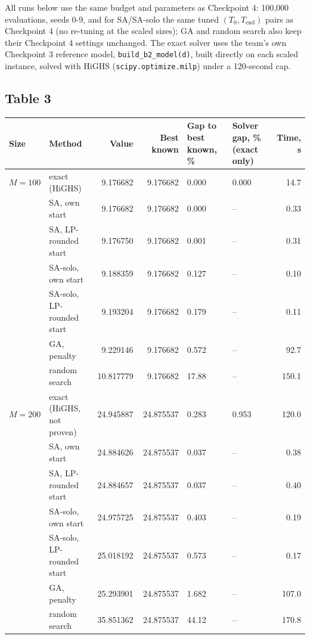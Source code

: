 \documentclass[11pt,a4paper]{article}
\begin{document}
All runs below use the same budget and parameters as Checkpoint 4: 100{,}000 evaluations, seeds 0-9, and for SA/SA-solo the same tuned $(T_0,T_{\mathrm{end}})$ pairs as Checkpoint 4 (no re-tuning at the scaled sizes); GA and random search also keep their Checkpoint 4 settings unchanged. The exact solver uses the team's own Checkpoint 3 reference model, \texttt{build\_b2\_model(d)}, built directly on each scaled instance, solved with HiGHS (\texttt{scipy.optimize.milp}) under a 120-second cap.

\subsection*{Table 3}
{\small
\begin{tabular}{@{}lp{3.8cm}rrp{2.0cm}p{2.2cm}r@{}}
\toprule
Size & Method & Value & Best known & Gap to best known, \% & Solver gap, \% (exact only) & Time, s\\
\midrule
$M{=}100$ & exact (HiGHS)            & 9.176682 & 9.176682 & 0.000 & 0.000 & 14.7\\
          & SA, own start            & 9.176682 & 9.176682 & 0.000 & -- & 0.33\\
          & SA, LP-rounded start     & 9.176750 & 9.176682 & 0.001 & -- & 0.31\\
          & SA-solo, own start       & 9.188359 & 9.176682 & 0.127 & -- & 0.10\\
          & SA-solo, LP-rounded start& 9.193204 & 9.176682 & 0.179 & -- & 0.11\\
          & GA, penalty              & 9.229146 & 9.176682 & 0.572 & -- & 92.7\\
          & random search            & 10.817779& 9.176682 & 17.88 & -- & 150.1\\
\addlinespace
$M{=}200$ & exact (HiGHS, not proven)& 24.945887& 24.875537& 0.283 & 0.953 & 120.0\\
          & SA, own start            & 24.884626& 24.875537& 0.037 & -- & 0.38\\
          & SA, LP-rounded start     & 24.884657& 24.875537& 0.037 & -- & 0.40\\
          & SA-solo, own start       & 24.975725& 24.875537& 0.403 & -- & 0.19\\
          & SA-solo, LP-rounded start& 25.018192& 24.875537& 0.573 & -- & 0.17\\
          & GA, penalty              & 25.293901& 24.875537& 1.682 & -- & 107.0\\
          & random search            & 35.851362& 24.875537& 44.12 & -- & 170.8\\

\end{tabular}}
\end{document}
